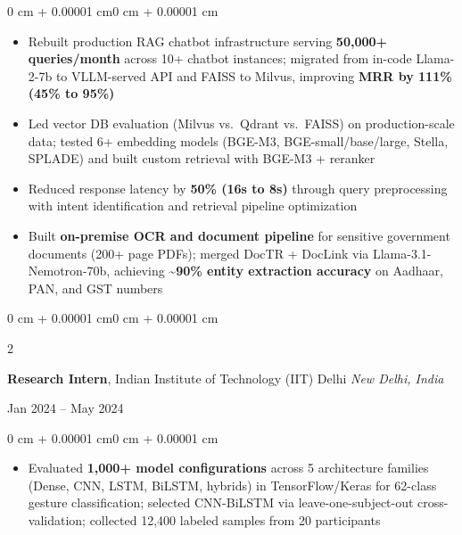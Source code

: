 \documentclass[10pt, letterpaper]{article}
\newenvironment{highlights}{
    \begin{itemize}[
        topsep=0.01 cm,
        parsep=0.01 cm,
        partopsep=0pt,
        itemsep=0pt,
        leftmargin=0 cm + 10pt
    ]
}{
    \end{itemize}
}
\newenvironment{onecolentry}{
    \begin{adjustwidth}{0 cm + 0.00001 cm}{0 cm + 0.00001 cm}
}{
    \end{adjustwidth}
}
\newenvironment{twocolentry}[2][]{
    \onecolentry
    \def\secondColumn{#2}
    \setcolumnwidth{\fill, 5.5 cm}
    \begin{paracol}{2}
}{
    \switchcolumn \raggedleft \secondColumn
    \end{paracol}
    \endonecolentry
}
\begin{document}
        \vspace{0.02 cm}
        \begin{onecolentry}
            \begin{highlights}
                \item Rebuilt production RAG chatbot infrastructure serving \textbf{50,000+ queries/month} across 10+ chatbot instances; migrated from in-code Llama-2-7b to VLLM-served API and FAISS to Milvus, improving \textbf{MRR by 111\% (45\% to 95\%)}
                \item Led vector DB evaluation (Milvus vs.\ Qdrant vs.\ FAISS) on production-scale data; tested 6+ embedding models (BGE-M3, BGE-small/base/large, Stella, SPLADE) and built custom retrieval with BGE-M3 + reranker
                \item Reduced response latency by \textbf{50\% (16s to 8s)} through query preprocessing with intent identification and retrieval pipeline optimization
                \item Built \textbf{on-premise OCR and document pipeline} for sensitive government documents (200+ page PDFs); merged DocTR + DocLink via Llama-3.1-Nemotron-70b, achieving \textasciitilde\textbf{90\% entity extraction accuracy} on Aadhaar, PAN, and GST numbers
            \end{highlights}
        \end{onecolentry}

        \vspace{0.05 cm}

        \begin{twocolentry}{
            Jan 2024 -- May 2024
        }
            \textbf{Research Intern}, Indian Institute of Technology (IIT) Delhi \hfill \textit{New Delhi, India}
        \end{twocolentry}

        \vspace{0.02 cm}
        \begin{onecolentry}
            \begin{highlights}
                \item Evaluated \textbf{1,000+ model configurations} across 5 architecture families (Dense, CNN, LSTM, BiLSTM, hybrids) in TensorFlow/Keras for 62-class gesture classification; selected CNN-BiLSTM via leave-one-subject-out cross-validation; collected 12,400 labeled samples from 20 participants
            \end{highlights}
        \end{onecolentry}
\end{document}
